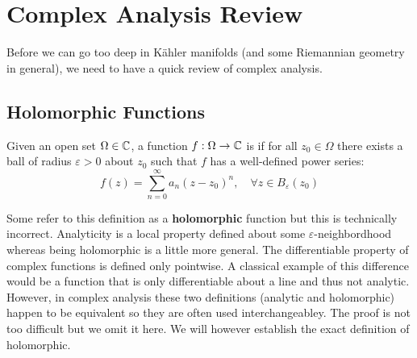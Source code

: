 \section{Complex Analysis Review}
Before we can go too deep in Kähler manifolds (and some Riemannian geometry in
general), we need to have a quick review of complex analysis.

\subsection{Holomorphic Functions}

\begin{definition}\label{def 3.1}
    Given an open set $\Omega \in \mathbb{C}$, a function $f: \Omega \to \mathbb{C}$ is 
    if for all $z_0 \in \Omega$ there exists a ball of radius $\varepsilon>0$ about
    $z_0$ such that $f$ has a well-defined power series:
    \begin{equation*}
        f(z) = \sum_{n=0}^\infty a_n (z-z_0)^n, \quad \forall z \in B_\varepsilon
        (z_0)
    \end{equation*}
\end{definition}

Some refer to this definition as a \textbf{holomorphic} function but this is technically
incorrect. Analyticity is a local property defined about some $\varepsilon$-neighbordhood
whereas being holomorphic is a little more general. The differentiable property of
complex functions is defined only pointwise. A classical example of this difference
would be a function that is only differentiable about a line and thus not analytic. 
However, in complex analysis these two definitions (analytic and holomorphic) happen
to be equivalent so they are often used interchangeabley. The proof is not too difficult
but we omit it here. We will however establish the exact definition of holomorphic.

